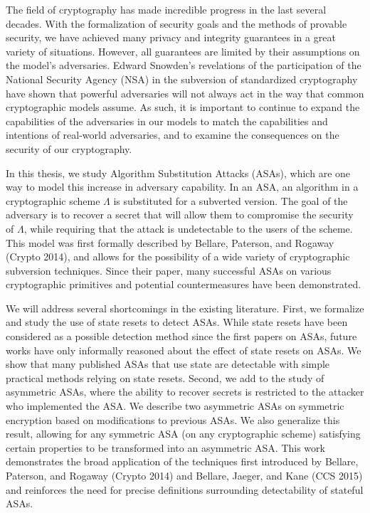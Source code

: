 The field of cryptography has made incredible progress in the last several decades. With the formalization of security goals and the methods of provable security, we have achieved many privacy and integrity guarantees in a great variety of situations. However, all guarantees are limited by their assumptions on the model's adversaries. Edward Snowden's revelations of the participation of the National Security Agency (NSA) in the subversion of standardized cryptography have shown that powerful adversaries will not always act in the way that common cryptographic models assume. As such, it is important to continue to expand the capabilities of the adversaries in our models to match the capabilities and intentions of real-world adversaries, and to examine the consequences on the security of our cryptography.

In this thesis, we study Algorithm Substitution Attacks (ASAs), which are one way to model this increase in adversary capability. In an ASA, an algorithm in a cryptographic scheme $\Lambda$ is substituted for a subverted version. The goal of the adversary is to recover a secret that will allow them to compromise the security of $\Lambda$, while requiring that the attack is undetectable to the users of the scheme. This model was first formally described by Bellare, Paterson, and Rogaway (Crypto 2014), and allows for the possibility of a wide variety of cryptographic subversion techniques. Since their paper, many successful ASAs on various cryptographic primitives and potential countermeasures have been demonstrated.

We will address several shortcomings in the existing literature. First, we formalize and study the use of state resets to detect ASAs. While state resets have been considered as a possible detection method since the first papers on ASAs, future works have only informally reasoned about the effect of state resets on ASAs. We show that many published ASAs that use state are detectable with simple practical methods relying on state resets. Second, we add to the study of asymmetric ASAs, where the ability to recover secrets is restricted to the attacker who implemented the ASA. We describe two asymmetric ASAs on symmetric encryption based on modifications to previous ASAs. We also generalize this result, allowing for any symmetric ASA (on any cryptographic scheme) satisfying certain properties to be transformed into an asymmetric ASA. This work demonstrates the broad application of the techniques first introduced by Bellare, Paterson, and Rogaway (Crypto 2014) and Bellare, Jaeger, and Kane (CCS 2015) and reinforces the need for precise definitions surrounding detectability of stateful ASAs.

